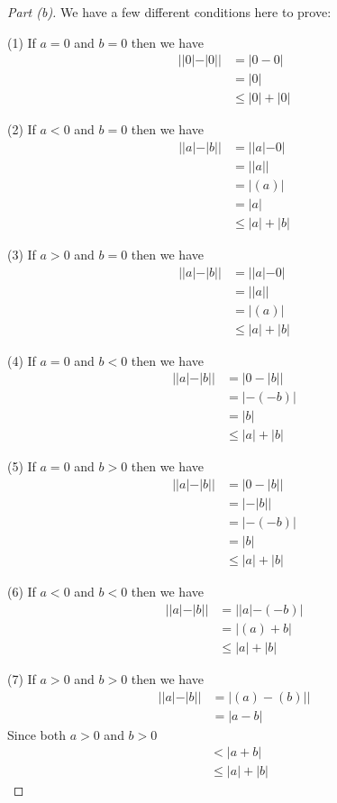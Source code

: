 \documentclass[leqno]{article}
\theoremstyle{nonumberplain}
\newtheorem{proof}{Proof}
\begin{document}
\begin{proof}[Part (b)]
We have a few different conditions here to prove:

(1) If $a=0$ and $b=0$ then we have 
\begin{align*}
||0|-|0|| &= |0-0|\\
&=|0|\\
&\leq |0|+|0|
\end{align*}

(2) If $a<0$ and $b=0$ then we have
\begin{align*}
||a|-|b|| &= ||a|-0|\\
&=||a||\\
&=|(a)|\\
&=|a|\\
&\leq |a|+|b|
\end{align*}

(3) If $a>0$ and $b=0$ then we have
\begin{align*}
||a|-|b|| &= ||a|-0|\\
&=||a||\\
&=|(a)|\\
&\leq |a|+|b|
\end{align*}

(4) If $a=0$ and $b<0$ then we have
\begin{align*}
||a|-|b|| &= |0-|b||\\
&=|-(-b)|\\
&=|b|\\
&\leq |a|+|b|
\end{align*}

(5) If $a=0$ and $b>0$ then we have
\begin{align*}
||a|-|b|| &= |0-|b||\\
&=|-|b||\\
&=|-(-b)|\\
&=|b|\\
&\leq |a|+|b|
\end{align*}

(6) If $a<0$ and $b<0$ then we have
\begin{align*}
||a|-|b|| &= ||a|-(-b)|\\
&=|(a)+b|\\
&\leq |a|+|b|
\end{align*}

(7) If $a>0$ and $b>0$ then we have
\begin{align*}
||a|-|b|| &= |(a)-(b)||\\
&=|a-b|
\end{align*}
Since both $a>0$ and $b>0$
\begin{align*}
&< |a+b|\\
&\leq |a|+|b|
\end{align*}



\end{proof}
\end{document}
